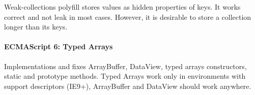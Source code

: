 \begin{DoxyItemize}
\item Weak-\/collections polyfill stores values as hidden properties of keys. It works correct and not leak in most cases. However, it is desirable to store a collection longer than its keys.
\end{DoxyItemize}

\paragraph*{E\+C\+M\+A\+Script 6\+: Typed Arrays}

Implementations and fixes {\ttfamily Array\+Buffer}, {\ttfamily Data\+View}, typed arrays constructors, static and prototype methods. Typed Arrays work only in environments with support descriptors (I\+E9+), {\ttfamily Array\+Buffer} and {\ttfamily Data\+View} should work anywhere.

